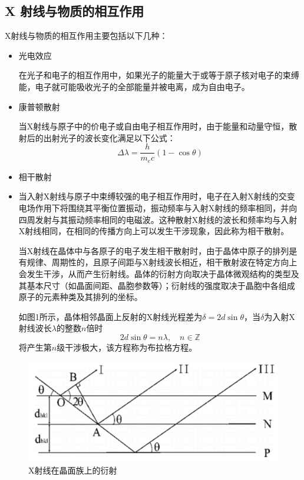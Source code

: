 \documentclass[11pt,a4paper]{article}
\begin{document}
\subsection{X 射线与物质的相互作用}
X射线与物质的相互作用主要包括以下几种：
\begin{itemize}
\item 光电效应

在光子和电子的相互作用中，如果光子的能量大于或等于原子核对电子的束缚能，电子就可能吸收光子的全部能量并被电离，成为自由电子。

\item 康普顿散射

当X射线与原子中的价电子或自由电子相互作用时，由于能量和动量守恒，散射后的出射光子的波长变化满足以下公式：
\begin{equation}
\Delta\lambda=\dfrac{h}{m_ec}(1-\cos\theta)
\end{equation}


\item 相干散射
\item 
当入射X射线与原子中束缚较强的电子相互作用时，电子在入射X射线的交变电场作用下将围绕其平衡位置振动，振动频率与入射X射线的频率相同，并向四周发射与其振动频率相同的电磁波。这种散射X射线的波长和频率均与入射X射线相同，在相同的传播方向上可以发生干涉现象，因此称为相干散射。

当X射线在晶体中与各原子的电子发生相干散射时，由于晶体中原子的排列是有规律、周期性的，且原子间距与X射线波长相近，相干散射波在特定方向上会发生干涉，从而产生衍射线。晶体的衍射方向取决于晶体微观结构的类型及其基本尺寸（如晶面间距、晶胞参数等）；衍射线的强度取决于晶胞中各组成原子的元素种类及其排列的坐标。

如图1所示，晶体相邻晶面上反射的X射线光程差为$\delta=2d\sin\theta$，当$\delta$为入射X射线波长$\lambda$的整数$n$倍时
\begin{equation}\label{eq
}
2d\sin\theta=n\lambda,\quad n\in\mathbb{Z}
\end{equation}
将产生第$n$级干涉极大，该方程称为布拉格方程。
\end{itemize}
\begin{figure}[H]
\centering
\includegraphics[scale=0.4]{1.jpg}
\captionsetup{font=footnotesize}
\caption{X射线在晶面族上的衍射}
\end{figure}
\end{document}
